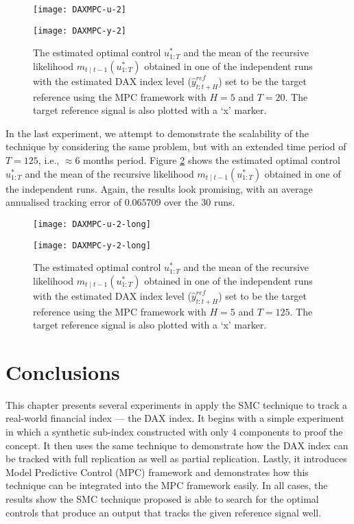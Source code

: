 \begin{figure}[htbp]
\centering
    \begin{minipage}{0.5\textwidth}
        \centering
        \texttt{[image: DAXMPC-u-2]}
    \end{minipage}%
    \begin{minipage}{0.5\textwidth}
        \centering
        \texttt{[image: DAXMPC-y-2]}
    \end{minipage}
\caption{The estimated optimal control $u^*_{1:T}$ and the mean of the recursive likelihood $m_{t \mid t-1}(u^*_{1:T})$ obtained in one of the independent runs with the estimated DAX index level ($\hat{y}^{ref}_{t:t+H}$) set to be the target reference using the MPC framework with $H=5$ and $T=20$.  The target reference signal is also plotted with a `x' marker.}
\label{fig:mpc2}
\end{figure}
In the last experiment, we attempt to demonstrate the scalability of the technique by considering the same problem, but with an extended time period of $T=125$, i.e., $\approx 6$ months period. Figure \ref{fig:mpc2long} shows the estimated optimal control $u^*_{1:T}$ and the mean of the recursive likelihood $m_{t \mid t-1}(u^*_{1:T})$ obtained in one of the independent runs. Again, the results look promising, with an average annualised tracking error of $0.065709$ over the $30$ runs. 

\begin{figure}[htbp]
\centering
    \begin{minipage}{\textwidth}
        \centering
        \texttt{[image: DAXMPC-u-2-long]}
    \end{minipage}
    \begin{minipage}{\textwidth}
        \centering
        \texttt{[image: DAXMPC-y-2-long]}
    \end{minipage}
\caption{The estimated optimal control $u^*_{1:T}$ and the mean of the recursive likelihood $m_{t \mid t-1}(u^*_{1:T})$ obtained in one of the independent runs with the estimated DAX index level ($\hat{y}^{ref}_{t:t+H}$) set to be the target reference using the MPC framework with $H=5$ and $T=125$.  The target reference signal is also plotted with a `x' marker.}
\label{fig:mpc2long}
\end{figure}

\section{Conclusions}
\label{sec:conclusion5}
This chapter presents several experiments in apply the SMC technique to track a real-world financial index --- the DAX index.  It begins with a simple experiment in which a synthetic sub-index constructed with only $4$ components to proof the concept. It then uses the same technique to demonstrate how the DAX index can be tracked with full replication as well as partial replication. Lastly, it introduces Model Predictive Control (MPC) framework and demonstrates how this technique can be integrated into the MPC framework easily. In all cases, the results show the SMC technique proposed is able to search for the optimal controls that produce an output that tracks the given reference signal well.
